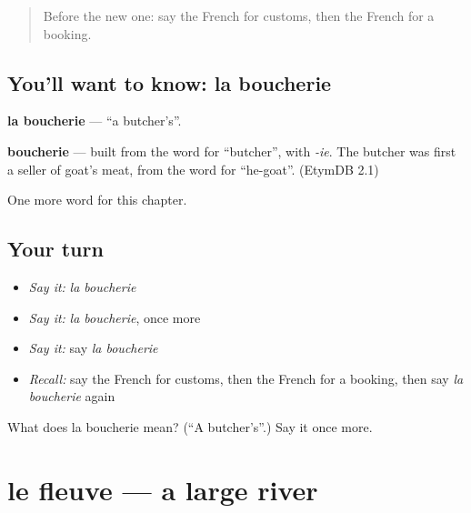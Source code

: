 \label{lesson:FR-C164-boucherie}



\begin{quote}
Before the new one: say the French for customs, then the French for a booking.
\end{quote}

\subsection*{You'll want to know: la boucherie}
\textbf{la boucherie} — \textquotedblleft{}a butcher's\textquotedblright{}.

\begin{cousinweb}
\textbf{boucherie} — built from the word for \textquotedblleft{}butcher\textquotedblright{}, with \emph{-ie}. The butcher was first a seller of goat's meat, from the word for \textquotedblleft{}he-goat\textquotedblright{}. (EtymDB 2.1)
\end{cousinweb}

\begin{grammarlens}[title={What you've built}]
One more word for this chapter.
\end{grammarlens}

\subsection*{Your turn}
\begin{itemize}
\raggedright
  \item \emph{Say it:} \emph{la boucherie}
  \item \emph{Say it:} \emph{la boucherie}, once more
  \item \emph{Say it:} say \emph{la boucherie}
  \item \emph{Recall:} say the French for customs, then the French for a booking, then say \emph{la boucherie} again
\end{itemize}

\begin{tcolorbox}[breakable,colback=teal!4,colframe=teal!35!black,title={Before you move on}]
What does la boucherie mean? (\textquotedblleft{}A butcher's\textquotedblright{}.) Say it once more.
\end{tcolorbox}
\section[le fleuve]{le fleuve — a large river}

\label{lesson:FR-C164-fleuve}



